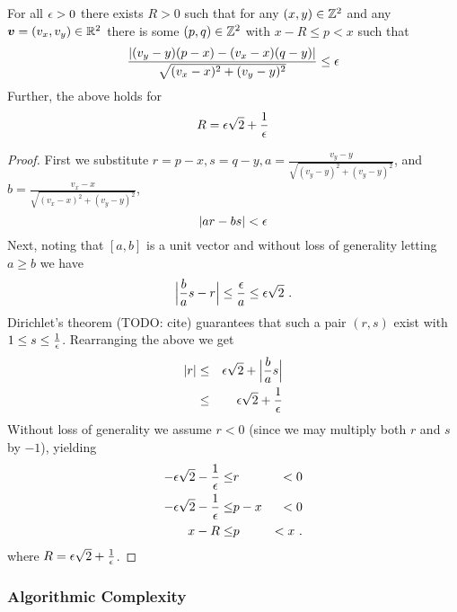 \newcommand\xa{p}
\newcommand\ya{q}
\begin{lemma}
  For all $\RoundoffEps>0$ there exists $R>0$ such that for any
  $(x,y)\in\Ints^2$ and any $\vpt=(v_x,v_y)\in\Reals^2$ there is some
  $(\xa,\ya)\in\Ints^2$ with $x-R\leq\xa<x$ such that
  \begin{equation}
    \frac{|(v_y-y)(\xa-x) - (v_x-x)(\ya-y)|}
         {\sqrt{(v_x-x)^2+(v_y-y)^2}}
    \leq \RoundoffEps
  \end{equation}
  Further, the above holds for
  \begin{equation}
    R = \RoundoffEps\sqrt{2} + \frac{1}{\RoundoffEps}
  \end{equation}
\end{lemma}
\begin{proof}
  First we substitute $r=\xa-x, s=\ya-y, a =
  \frac{v_y-y}{\sqrt{(v_y-y)^2+(v_y-y)^2}}$, and $b =
  \frac{v_x-x}{\sqrt{(v_x-x)^2+(v_y-y)^2}}$,
  \begin{equation}
    |ar - bs| < \RoundoffEps
  \end{equation}
  Next, noting that $[a,b]$ is a unit vector and without loss of
  generality letting $a \geq b$ we have
  \begin{equation}
    \Bigl|\frac{b}{a}s - r\Bigr| \leq \frac{\RoundoffEps}{a} 
      \leq \RoundoffEps \sqrt{2} ~.
  \end{equation}
  Dirichlet's theorem (TODO: cite) guarantees that such a pair $(r,s)$
  exist with $1 \leq s\leq\frac{1}{\RoundoffEps}$. Rearranging the above we get
  \begin{eqnarray}
    |r| &\leq& \RoundoffEps\sqrt{2} + \Bigl|\frac{b}{a}s\Bigr|\\
    &\leq& \RoundoffEps\sqrt{2} + \frac{1}{\RoundoffEps}\\
  \end{eqnarray}
  Without loss of generality we assume $r<0$ (since we may multiply
  both $r$ and $s$ by $-1$), yielding
  \begin{eqnarray}
    -\RoundoffEps\sqrt{2} - \frac{1}{\RoundoffEps} \leq &r& < 0\\
    -\RoundoffEps\sqrt{2} - \frac{1}{\RoundoffEps} \leq &p-x& < 0\\
    x-R \leq &p& < x ~.
  \end{eqnarray}
  where $R = \RoundoffEps\sqrt{2}+\frac{1}{\RoundoffEps}$.
\end{proof}

\subsubsection{Algorithmic Complexity}

